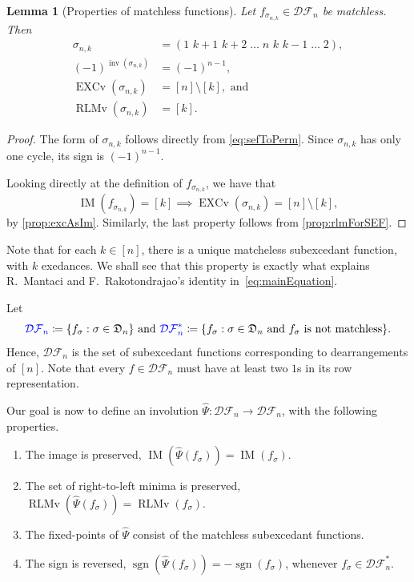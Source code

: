\documentclass[reqno]{amsart}
\newtheorem{lemma}[theorem]{Lemma}
\theoremstyle{definition}
\newcommand{\defin}[1]{%
\relax\ifmmode%
\textcolor{blue}{#1}%
\else\textcolor{blue}{\emph{#1}}%
\fi%
}
\newcommand{\dArr}{\mathfrak{D}}
\newcommand{\DSEF}{\mathcal{DF}}%
\newcommand{\fretherD}{\hat{\Psi}}
\DeclareMathOperator{\inv}{inv}
\DeclareMathOperator{\sgn}{sgn}
\DeclareMathOperator{\EXCv}{EXCv}
\DeclareMathOperator{\RLMv}{RLMv}
\DeclareMathOperator{\supp}{IM}
\begin{document}
\begin{lemma}[Properties of matchless functions]\label{lem:propertiesOfMatchless}
Let $f_{\sigma_{n,k}} \in \DSEF_n$ be matchless.
Then 
 \begin{align*}
  \sigma_{n,k} &=
(1\,\,k{+}1\,\,k{+}2 \; \dotsc\; n\,\,k\,\,k{-}1 \; \dotsc \; 2), \\
(-1)^{\inv(\sigma_{n,k})} &= (-1)^{n-1}, \\
\EXCv(\sigma_{n,k}) &= [n]\setminus [k],\text{ and }\\
\RLMv(\sigma_{n,k}) &= [k].
\end{align*}
\end{lemma}
\begin{proof}
The form of $\sigma_{n,k}$ follows directly from \eqref{eq:sefToPerm}.
Since $\sigma_{n,k}$ has only one cycle, its sign is $(-1)^{n-1}$.

Looking directly at the definition of $f_{\sigma_{n,k}}$, 
we have that
\[
 \supp(f_{\sigma_{n,k}}) = [k] \implies \EXCv(\sigma_{n,k}) = [n]\setminus [k],
\]
by \cref{prop:excAsIm}. Similarly, the last property follows from 
\cref{prop:rlmForSEF}.
\end{proof}
Note that for each $k \in [n]$, there is a unique matcheless 
subexcedant function, with $k$ exedances.
We shall see that this property is exactly what explains 
R.~Mantaci and F.~Rakotondrajao's identity in~\cref{eq:mainEquation}.
\vspace{1cm}


Let 
\begin{equation}
 \defin{\DSEF_n} \coloneqq \{ f_{\sigma} : \sigma\in \dArr_n \}
 \text{ and }
  \defin{\DSEF^*_n} \coloneqq \{ f_{\sigma} : \sigma\in \dArr_n 
 \text{ and $f_{\sigma}$ is not matchless}\}.
\end{equation}
Hence, $\DSEF_n$ is the set of subexcedant functions 
corresponding to dearrangements of $[n]$.
%
Note that every $f \in \DSEF_n$ must have at least two $1$s
in its row representation.

Our goal is now to define an involution $\fretherD:\DSEF_n\longrightarrow \DSEF_n$, 
with the following properties.
\begin{enumerate}[label=(\roman*)]
\item 
	The image is preserved, $\supp(\fretherD(f_\sigma )) = \supp( f_\sigma )$.
\item 
	The set of right-to-left minima is preserved,
	$\RLMv( \fretherD(f_\sigma ) ) = \RLMv( f_\sigma )$.
\item 
	The fixed-points of $\fretherD$ consist of the matchless subexcedant functions.
\item 
	The sign is reversed, $\sgn(\fretherD(f_\sigma )) = -\sgn( f_\sigma )$,
	whenever $f_\sigma \in \DSEF_n^*$.
\end{enumerate}
\end{document}
